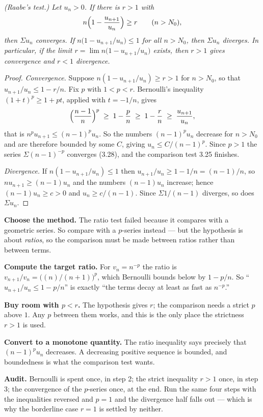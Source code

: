 \emph{(Raabe's test.) Let $u_n > 0$. If there is $r > 1$ with}
\[ n\Bigl(1 - \frac{u_{n+1}}{u_n}\Bigr) \ge r \qquad (n > N_0), \]
\emph{then $\Sigma u_n$ converges. If $n\bigl(1 - u_{n+1}/u_n\bigr) \le 1$
for all $n > N_0$, then $\Sigma u_n$ diverges. In particular, if the limit
$r = \lim n\bigl(1-u_{n+1}/u_n\bigr)$ exists, then $r>1$ gives convergence
and $r<1$ divergence.}
\begin{proof}
\emph{Convergence.} Suppose $n(1-u_{n+1}/u_n) \ge r > 1$ for $n>N_0$, so
that $u_{n+1}/u_n \le 1 - r/n$. Fix $p$ with $1<p<r$. Bernoulli's inequality
$(1+t)^p \ge 1+pt$, applied with $t=-1/n$, gives
\[ \Bigl(\frac{n-1}{n}\Bigr)^{p} \;\ge\; 1 - \frac{p}{n} \;\ge\;
   1 - \frac{r}{n} \;\ge\; \frac{u_{n+1}}{u_n} , \]
that is $n^p u_{n+1} \le (n-1)^p u_n$. So the numbers $(n-1)^pu_n$ decrease
for $n>N_0$ and are therefore bounded by some $C$, giving
$u_n \le C/(n-1)^p$. Since $p>1$ the series $\Sigma (n-1)^{-p}$ converges
(3.28), and the comparison test 3.25 finishes.

\emph{Divergence.} If $n(1-u_{n+1}/u_n) \le 1$ then
$u_{n+1}/u_n \ge 1-1/n = (n-1)/n$, so $nu_{n+1} \ge (n-1)u_n$ and the numbers
$(n-1)u_n$ increase; hence $(n-1)u_n \ge c>0$ and $u_n \ge c/(n-1)$. Since
$\Sigma 1/(n-1)$ diverges, so does $\Sigma u_n$.
\end{proof}

\begin{proofwalk}
  \item \textbf{Choose the method.} The ratio test failed because it compares
        with a geometric series. So compare with a $p$-series instead --- but
        the hypothesis is about \emph{ratios}, so the comparison must be made
        between ratios rather than between terms.
  \item \textbf{Compute the target ratio.} For $v_n = n^{-p}$ the ratio is
        $v_{n+1}/v_n = \bigl((n)/(n+1)\bigr)^{p}$, which Bernoulli bounds
        below by $1-p/n$. So ``$u_{n+1}/u_n \le 1 - p/n$'' is exactly ``the
        terms decay at least as fast as $n^{-p}$.''
  \item \textbf{Buy room with $p<r$.} The hypothesis gives $r$; the
        comparison needs a strict $p$ above $1$. Any $p$ between them works,
        and this is the only place the strictness $r>1$ is used.
  \item \textbf{Convert to a monotone quantity.} The ratio inequality says
        precisely that $(n-1)^pu_n$ decreases. A decreasing positive sequence
        is bounded, and boundedness is what the comparison test wants.
  \item \textbf{Audit.} Bernoulli is spent once, in step 2; the strict
        inequality $r>1$ once, in step 3; the convergence of the $p$-series
        once, at the end. Run the same four steps with the inequalities
        reversed and $p=1$ and the divergence half falls out --- which is why
        the borderline case $r=1$ is settled by neither.
\end{proofwalk}

